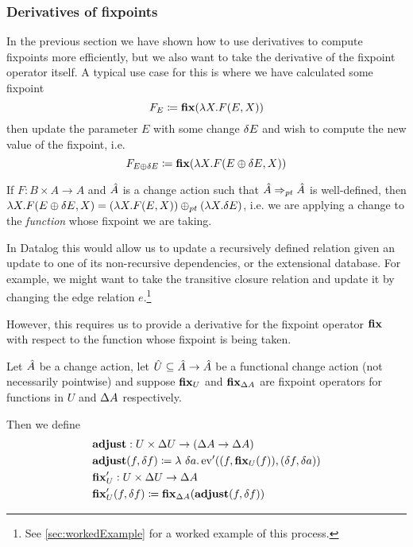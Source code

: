 \subsubsection{Derivatives of fixpoints}
\label{sec:fixpointDerivatives}

In the previous section we have shown how to use derivatives to compute fixpoints
more efficiently, but we also want to take the derivative of the fixpoint
operator itself. A typical use case for this is where we have calculated some fixpoint
\begin{displaymath}
  F_{E} \coloneqq \mathbf{fix} (\lambda X . F(E, X))
\end{displaymath}
then update the parameter $E$ with some change $\delta E$ and wish to compute the new
value of the fixpoint, i.e.
\begin{displaymath}
  F_{E \oplus \delta E} \coloneqq \mathbf{fix} (\lambda X . F(E \oplus \delta E, X))
\end{displaymath}

If $F : B \times A \rightarrow A$ and $\hat{A}$ is a change action such that 
$\hat{A} \Rightarrow_{pt} \hat{A}$ is well-defined, then 
$\lambda X . F(E \oplus \delta E, X) = (\lambda X . F(E, X)) \oplus_{pt} (\lambda X . \delta E)$,
i.e. we are applying a change to the \emph{function} whose fixpoint we are taking.

In Datalog this would allow us to update a recursively defined relation given an
update to one of its non-recursive dependencies, or the extensional database.
For example, we might want to take the transitive closure relation
and update it by changing the edge relation $e$.\footnote{See
  \cref{sec:workedExample} for a worked example of this process.}

However, this requires us to provide a derivative for the fixpoint operator
$\mathbf{fix}$ with respect to the function whose fixpoint is being taken.

\begin{defn}
\label{def:fixpointDerivatives}
  Let $\hat{A}$ be a change action, let $\hat{U} \subseteq \hat{A} \rightarrow \hat{A}$ be a functional
  change action (not necessarily pointwise) and suppose $\mathbf{fix}_U$ and $\mathbf{fix}_{\Delta A}$ are fixpoint
  operators for functions in $U$ and $\Delta A$ respectively.
  
  Then we define
  \begin{align*}
    &\mathbf{adjust} : U \times \Delta U \rightarrow (\Delta A \rightarrow \Delta A)\\
    &\mathbf{adjust}(f, \delta f) \coloneqq \lambda\ \delta a . \operatorname{ev}'((f, \mathbf{fix}_U(f)), (\delta f, \delta a))\\
    &\mathbf{fix}_U' : U \times \Delta U \rightarrow \Delta A\\
    &\mathbf{fix}_U'(f, \delta f) \coloneqq \mathbf{fix}_{\Delta A}(\mathbf{adjust}(f, \delta f))
  \end{align*}
\end{defn}

